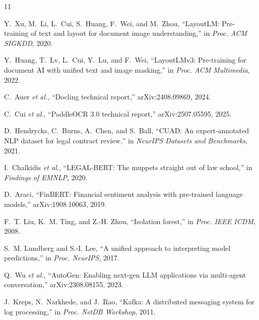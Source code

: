\documentclass[12pt]{report}
\begin{document}
\begin{thebibliography}{11}

Y.~Xu, M.~Li, L.~Cui, S.~Huang, F.~Wei, and M.~Zhou, ``LayoutLM: Pre-training of text and layout for document image understanding,'' in \emph{Proc. ACM SIGKDD}, 2020.

Y.~Huang, T.~Lv, L.~Cui, Y.~Lu, and F.~Wei, ``LayoutLMv3: Pre-training for document AI with unified text and image masking,'' in \emph{Proc. ACM Multimedia}, 2022.

C.~Auer \emph{et al.}, ``Docling technical report,'' arXiv:2408.09869, 2024.

C.~Cui \emph{et al.}, ``PaddleOCR 3.0 technical report,'' arXiv:2507.05595, 2025.

D.~Hendrycks, C.~Burns, A.~Chen, and S.~Ball, ``CUAD: An expert-annotated NLP dataset for legal contract review,'' in \emph{NeurIPS Datasets and Benchmarks}, 2021.

I.~Chalkidis \emph{et al.}, ``LEGAL-BERT: The muppets straight out of law school,'' in \emph{Findings of EMNLP}, 2020.

D.~Araci, ``FinBERT: Financial sentiment analysis with pre-trained language models,'' arXiv:1908.10063, 2019.

F.~T. Liu, K.~M. Ting, and Z.-H. Zhou, ``Isolation forest,'' in \emph{Proc. IEEE ICDM}, 2008.

S.~M. Lundberg and S.-I. Lee, ``A unified approach to interpreting model predictions,'' in \emph{Proc. NeurIPS}, 2017.

Q.~Wu \emph{et al.}, ``AutoGen: Enabling next-gen LLM applications via multi-agent conversation,'' arXiv:2308.08155, 2023.

J.~Kreps, N.~Narkhede, and J.~Rao, ``Kafka: A distributed messaging system for log processing,'' in \emph{Proc. NetDB Workshop}, 2011.

\end{thebibliography}







\end{document}
